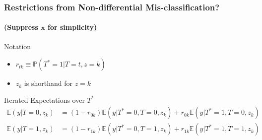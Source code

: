 \documentclass[handout]{beamer}
\begin{document}
%
%
%
%
\begin{frame}[t]
  \frametitle{Restrictions from Non-differential Mis-classification?}
  \framesubtitle{(Suppress $\mathbf{x}$ for simplicity)}

  \footnotesize

  \begin{block}{Notation}
    \begin{itemize}
      \item $r_{tk} \equiv \mathbb{P}(T^*=1|T=t,z=k)$
      \item $z_k$ is shorthand for $z =k$\\
    \end{itemize}
  \end{block}

  \begin{block}{Iterated Expectations over $T^*$}
    \vspace{-1em}
  \begin{align*}
    \mathbb{E}(y|T=0,z_k) &= (1 - r_{0k})\mathbb{E}(y|T^*=0,T=0,z_k) + r_{0k}\mathbb{E}(y|T^*=1,T=0,z_k)\\
    \mathbb{E}(y|T=1,z_k) &= (1 - r_{1k}) \mathbb{E}(y|T^*=0,T=1,z_k) + r_{1k}\mathbb{E}(y|T^*=1,T=1,z_k)
  \end{align*}
  \end{block}


\end{frame}
\end{document}
